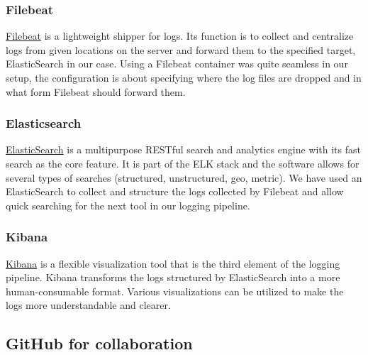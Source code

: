\documentclass[12pt]{article}
\begin{document}
\subsubsection{Filebeat}
\href{https://www.elastic.co/beats/filebeat}{Filebeat} is a lightweight shipper for logs. Its function is to collect and centralize logs from given locations on the server and forward them to the specified target, ElasticSearch in our case. Using a Filebeat container was quite seamless in our setup, the configuration is about specifying where the log files are dropped and in what form Filebeat should forward them. 

\subsubsection{Elasticsearch}
\href{https://www.elastic.co/elasticsearch/}{ElasticSearch} is a multipurpose RESTful search and analytics engine with its fast search as the core feature. It is part of the ELK stack and the software allows for several types of searches (structured, unstructured, geo, metric). We have used an ElasticSearch to collect and structure the logs collected by Filebeat and allow quick searching for the next tool in our logging pipeline.

\subsubsection{Kibana}
\href{https://www.elastic.co/kibana}{Kibana} is a flexible visualization tool that is the third element of the logging pipeline. Kibana transforms the logs structured by ElasticSearch into a more human-consumable format. Various visualizations can be utilized to make the logs more understandable and clearer.
\subsection{GitHub for collaboration}
\end{document}
